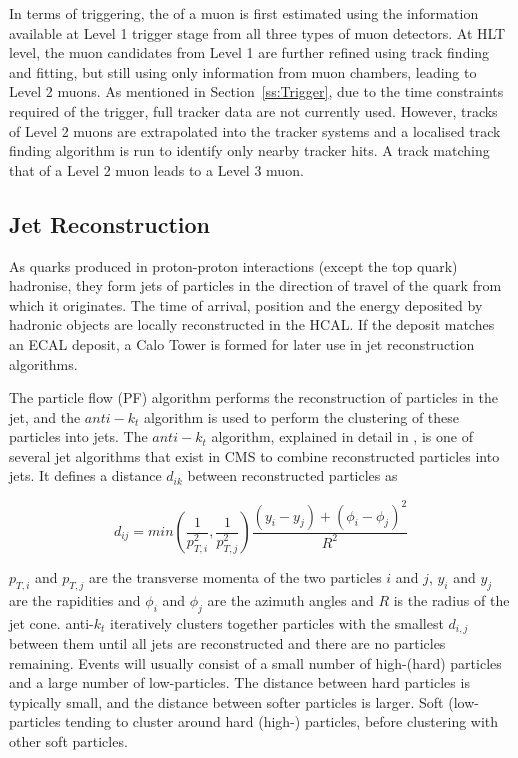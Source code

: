 In terms of triggering, the \pt of a muon is first estimated using the information available at Level 1
trigger stage from all three types of muon detectors. At HLT level, the muon candidates from Level 1 are
further refined using track finding and fitting, but still using only information from muon chambers, leading
to Level 2 muons. As mentioned in Section~\ref{ss:Trigger}, due to the time constraints required of the
trigger, full tracker data are not currently used. However, tracks of Level 2 muons are extrapolated into the
tracker systems and a localised track finding algorithm is run to identify only nearby tracker hits. A
track matching that of a Level 2 muon leads to a Level 3 muon. %

\subsection{Jet Reconstruction}
\label{ss:jet_reconstruction}
As quarks produced in proton-proton interactions (except the top quark) hadronise, they form jets of particles
in the direction of travel of the quark from which it originates. The time of arrival, position and the energy
deposited by hadronic objects are locally reconstructed in the HCAL. If the deposit matches an ECAL deposit, a
Calo Tower is formed for later use in jet reconstruction algorithms.

The particle flow (PF) algorithm performs the reconstruction of particles in the jet, and the $anti-k_{t}$
algorithm is used to perform the clustering of these particles into jets. The $anti-k_{t}$ algorithm,
explained in detail in \cite{anti_kt}, is one of several jet algorithms that exist in CMS to
combine reconstructed particles into jets. It defines a distance $d_{ik}$ between reconstructed particles as

\begin{equation}
d_{ij} = min(\frac{1}{p_{T,i}^{2}},\frac{1}{p_{T,j}^{2}})\frac{(y_{i}-y_{j})+(\phi_{i}-\phi_{j})^{2}}{R^{2}}
\end{equation}

$p_{T,i}$ and $p_{T,j}$ are the transverse momenta of the two particles $i$ and $j$, $y_{i}$ and $y_{j}$ are
the rapidities and $\phi_{i}$ and $\phi_{j}$ are the azimuth angles and $R$ is the radius of the jet cone.
anti-$k_{t}$ iteratively clusters together particles with the smallest $d_{i,j}$ between them until all jets
are reconstructed and there are no particles remaining. Events will usually consist of a small number of
high-\pt (hard) particles and a large number of low-\pt particles. The distance between hard particles
is typically small, and the distance between softer particles is larger. Soft (low-\pt particles tending to
cluster around hard (high-\pt) particles, before clustering with other soft particles.

